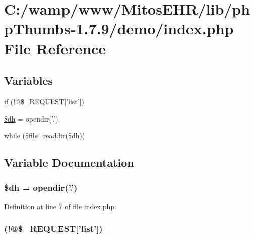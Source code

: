 \hypertarget{lib_2php_thumbs-1_87_89_2demo_2index_8php}{\section{\-C\-:/wamp/www/\-Mitos\-E\-H\-R/lib/php\-Thumbs-\/1.7.9/demo/index.php \-File \-Reference}
\label{lib_2php_thumbs-1_87_89_2demo_2index_8php}
}
\subsection*{\-Variables}
\begin{DoxyCompactItemize}
\item 
\hyperlink{lib_2php_thumbs-1_87_89_2demo_2index_8php_a6a968870d8bbf8bbf23251e1152c5343}{if} (!@\$\-\_\-\-R\-E\-Q\-U\-E\-S\-T\mbox{[}'list'\mbox{]})
\item 
\hyperlink{lib_2php_thumbs-1_87_89_2demo_2index_8php_a62a95313e4c30943d2bdad9a9b09c92e}{\$dh} = opendir('.')
\item 
\hyperlink{lib_2php_thumbs-1_87_89_2demo_2index_8php_a28ef4f834fa32da6e8b4681497a3afba}{while} (\$file=readdir(\$dh))
\end{DoxyCompactItemize}


\subsection{\-Variable \-Documentation}
\hypertarget{lib_2php_thumbs-1_87_89_2demo_2index_8php_a62a95313e4c30943d2bdad9a9b09c92e}{
\subsubsection[{\$dh}]{\setlength{\rightskip}{0pt plus 5cm}\$dh = opendir('.')}}\label{lib_2php_thumbs-1_87_89_2demo_2index_8php_a62a95313e4c30943d2bdad9a9b09c92e}


\-Definition at line 7 of file index.\-php.

\hypertarget{lib_2php_thumbs-1_87_89_2demo_2index_8php_a6a968870d8bbf8bbf23251e1152c5343}{
\subsubsection[{if}]{(!@\$\-\_\-\-R\-E\-Q\-U\-E\-S\-T\mbox{[}'list'\mbox{]})}}\label{lib_2php_thumbs-1_87_89_2demo_2index_8php_a6a968870d8bbf8bbf23251e1152c5343}


